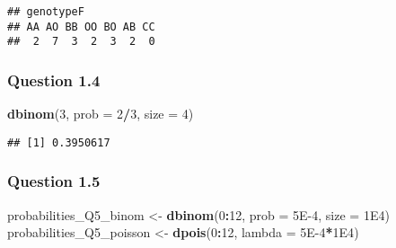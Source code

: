 \documentclass[]{article}
\newenvironment{Shaded}{\begin{snugshade}}{\end{snugshade}}
\newcommand{\KeywordTok}[1]{\textcolor[rgb]{0.13,0.29,0.53}{\textbf{#1}}}
\newcommand{\DataTypeTok}[1]{\textcolor[rgb]{0.13,0.29,0.53}{#1}}
\newcommand{\DecValTok}[1]{\textcolor[rgb]{0.00,0.00,0.81}{#1}}
\newcommand{\FloatTok}[1]{\textcolor[rgb]{0.00,0.00,0.81}{#1}}
\newcommand{\StringTok}[1]{\textcolor[rgb]{0.31,0.60,0.02}{#1}}
\newcommand{\OperatorTok}[1]{\textcolor[rgb]{0.81,0.36,0.00}{\textbf{#1}}}
\newcommand{\NormalTok}[1]{#1}
\begin{document}
\begin{verbatim}
## genotypeF
## AA AO BB OO BO AB CC 
##  2  7  3  2  3  2  0
\end{verbatim}

\subsubsection{Question 1.4}\label{question-1.4}

\begin{Shaded}
\begin{Highlighting}[]
\KeywordTok{dbinom}\NormalTok{(}\DecValTok{3}\NormalTok{, }\DataTypeTok{prob =} \DecValTok{2}\OperatorTok{/}\DecValTok{3}\NormalTok{, }\DataTypeTok{size =} \DecValTok{4}\NormalTok{)}
\end{Highlighting}
\end{Shaded}

\begin{verbatim}
## [1] 0.3950617
\end{verbatim}

\subsubsection{Question 1.5}\label{question-1.5}

\begin{Shaded}
\begin{Highlighting}[]
\NormalTok{probabilities_Q5_binom <-}\StringTok{ }\KeywordTok{dbinom}\NormalTok{(}\DecValTok{0}\OperatorTok{:}\DecValTok{12}\NormalTok{, }\DataTypeTok{prob =} \FloatTok{5E-4}\NormalTok{, }\DataTypeTok{size =} \FloatTok{1E4}\NormalTok{)}
\NormalTok{probabilities_Q5_poisson <-}\StringTok{ }\KeywordTok{dpois}\NormalTok{(}\DecValTok{0}\OperatorTok{:}\DecValTok{12}\NormalTok{, }\DataTypeTok{lambda =} \FloatTok{5E-4}\OperatorTok{*}\FloatTok{1E4}\NormalTok{)}
\end{Highlighting}
\end{Shaded}
\end{document}

